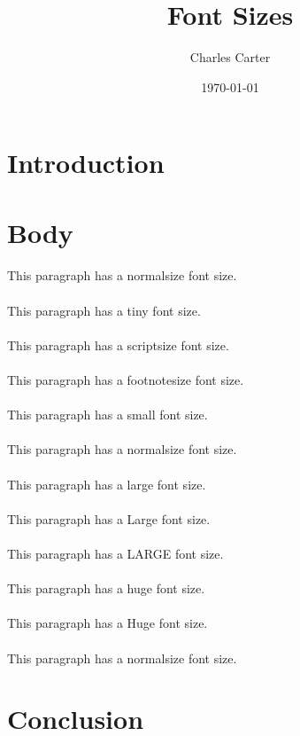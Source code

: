 \documentclass{article}
\title{Font Sizes}
\author{Charles Carter}
\date{\today{}}
\begin{document}
 
    \maketitle{}
    \section{Introduction}
    \label{Introduction}
    \section{Body}
    \label{Body}
    \normalsize{}\paragraph{}This paragraph has a normalsize font size.
    \tiny{}\paragraph{}This paragraph has a tiny font size.
    \scriptsize{}\paragraph{}This paragraph has a scriptsize font size.
    \footnotesize{}\paragraph{}This paragraph has a footnotesize font size.
    \small{}\paragraph{}This paragraph has a small font size.
    \normalsize{}\paragraph{}This paragraph has a normalsize font size.
    \large{}\paragraph{}This paragraph has a large font size.
    \Large{}\paragraph{}This paragraph has a Large font size.
    \LARGE{}\paragraph{}This paragraph has a LARGE font size.
    \huge{}\paragraph{}This paragraph has a huge font size.
    \Huge{}\paragraph{}This paragraph has a Huge font size.
    \normalsize{}\paragraph{}This paragraph has a normalsize font size.
    \section{Conclusion}
    \label{Conclusion}
\end{document}
